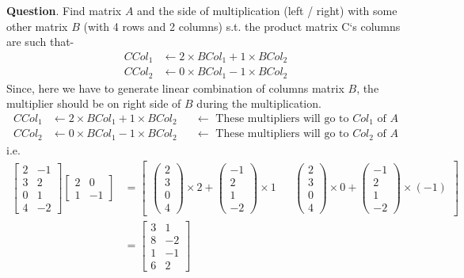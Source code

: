 \documentclass{article}
\begin{document}
\textbf{Question}. Find matrix $A$ and the side of multiplication (left / right) with some other matrix $B$ (with 4 rows and 2 columns) s.t. the product matrix C`s columns are such that-
\begin{align}
    CCol_1 &\leftarrow 2\times BCol_1 + 1\times BCol_2\nonumber\\
    CCol_2 &\leftarrow 0\times BCol_1 - 1\times BCol_2\nonumber
\end{align}
Since, here we have to generate linear combination of columns matrix $B$, the multiplier should be on right side of $B$ during the multiplication.
\begin{align}
    CCol_1 & \leftarrow 2 \times BCol_1 + 1 \times BCol_2 &&\leftarrow \text{ These multipliers will go to }Col_1\text{ of } A\nonumber\\
    CCol_2 & \leftarrow 0 \times BCol_1 - 1\times BCol_2 && \leftarrow \text{ These multipliers will go to }Col_2\text{ of } A\nonumber
\end{align}
i.e.
\begin{align}
    \begin{bmatrix}
        2 & -1\\
        3 & 2\\
        0 & 1\\
        4 & -2
    \end{bmatrix}\begin{bmatrix}
                    2 & 0\\
                    1 & -1
                 \end{bmatrix} &= \begin{bmatrix}\begin{pmatrix}
        2 \\
        3 \\
        0 \\
        4 
    \end{pmatrix}\times 2+\begin{pmatrix}
        -1\\
        2\\
        1\\
        -2
    \end{pmatrix}\times 1 && \begin{pmatrix}
        2 \\
        3 \\
        0 \\
        4 
    \end{pmatrix}\times 0+\begin{pmatrix}
        -1\\
        2\\
        1\\
        -2
    \end{pmatrix}\times (-1)
    \end{bmatrix} \nonumber\\
    &= \begin{bmatrix}
        3 & 1\\
        8 & -2\\
        1 & -1\\
        6 & 2
    \end{bmatrix} \nonumber
\end{align}
\end{document}
